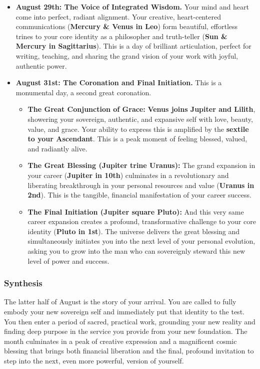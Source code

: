 \documentclass{article}
\begin{document}
\begin{itemize}
\item
  \textbf{August 29th: The Voice of Integrated Wisdom.} Your mind and heart come into perfect, radiant alignment. Your creative, heart-centered communications (\textbf{Mercury \& Venus in Leo}) form beautiful, effortless trines to your core identity as a philosopher and truth-teller (\textbf{Sun \& Mercury in Sagittarius}). This is a day of brilliant articulation, perfect for writing, teaching, and sharing the grand vision of your work with joyful, authentic power.
\item
  \textbf{August 31st: The Coronation and Final Initiation.} This is a monumental day, a second great coronation.

  \begin{itemize}
  \tightlist
  \item
    \textbf{The Great Conjunction of Grace:} \textbf{Venus joins Jupiter and Lilith}, showering your sovereign, authentic, and expansive self with love, beauty, value, and grace. Your ability to express this is amplified by the \textbf{sextile to your Ascendant}. This is a peak moment of feeling blessed, valued, and radiantly alive.
  \item
    \textbf{The Great Blessing (Jupiter trine Uranus):} The grand expansion in your career (\textbf{Jupiter in 10th}) culminates in a revolutionary and liberating breakthrough in your personal resources and value (\textbf{Uranus in 2nd}). This is the tangible, financial manifestation of your career success.
  \item
    \textbf{The Final Initiation (Jupiter square Pluto):} And this very same career expansion creates a profound, transformative challenge to your core identity (\textbf{Pluto in 1st}). The universe delivers the great blessing and simultaneously initiates you into the next level of your personal evolution, asking you to grow into the man who can sovereignly steward this new level of power and success.
  \end{itemize}
\end{itemize}

\subsubsection*{Synthesis}\label{synthesis}

The latter half of August is the story of your arrival. You are called to fully embody your new sovereign self and immediately put that identity to the test. You then enter a period of sacred, practical work, grounding your new reality and finding deep purpose in the service you provide from your new foundation. The month culminates in a peak of creative expression and a magnificent cosmic blessing that brings both financial liberation and the final, profound invitation to step into the next, even more powerful, version of yourself.
\end{document}
